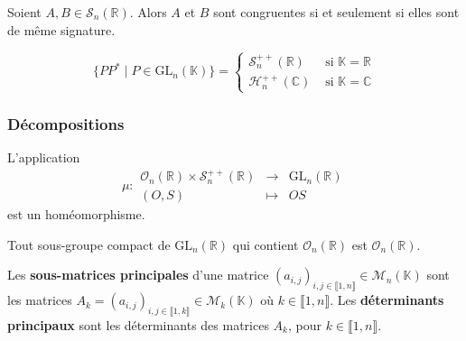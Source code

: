 	\begin{corollary}
		Soient $A, B \in \mathcal{S}_n(\mathbb{R})$. Alors $A$ et $B$ sont congruentes si et seulement si elles sont de même signature.
	\end{corollary}
	
	
	\begin{application}
		\[
			\{ P P^* \mid P \in \mathrm{GL}_n(\mathbb{K}) \} =
			\begin{cases}
				\mathcal{S}_n^{++}(\mathbb{R}) &\text{ si } \mathbb{K} = \mathbb{R} \\
				\mathcal{H}_n^{++}(\mathbb{C}) &\text{ si } \mathbb{K} = \mathbb{C}
			\end{cases}
		\]
	\end{application}
	
	\subsubsection{Décompositions}
	
	
	\begin{application}
		L'application
		\[ \mu :
		\begin{array}{ccc}
			\mathcal{O}_n(\mathbb{R}) \times \mathcal{S}_n^{++}(\mathbb{R}) &\rightarrow& \mathrm{GL}_n(\mathbb{R}) \\
			(O, S) &\mapsto& OS
		\end{array}
		\]
		est un homéomorphisme.
	\end{application}
	
	\begin{corollary}
		Tout sous-groupe compact de $\mathrm{GL}_n(\mathbb{R})$ qui contient $\mathcal{O}_n(\mathbb{R})$ est $\mathcal{O}_n(\mathbb{R})$.
	\end{corollary}
	
	
	\begin{definition}
		Les \textbf{sous-matrices principales} d'une matrice $(a_{i,j})_{i,j \in \llbracket 1, n \rrbracket} \in \mathcal{M}_n(\mathbb{K})$ sont les matrices $A_k = (a_{i,j})_{i,j \in \llbracket 1, k \rrbracket} \in \mathcal{M}_k(\mathbb{K})$ où $k \in \llbracket 1, n \rrbracket$. Les \textbf{déterminants principaux} sont les déterminants des matrices $A_k$, pour $k \in \llbracket 1, n \rrbracket$.
	\end{definition}
	
